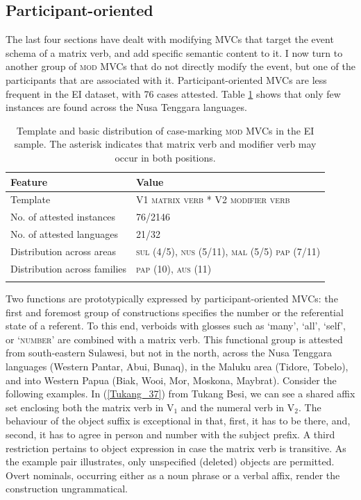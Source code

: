 \subsection{Participant-oriented}

The last four sections have dealt with modifying MVCs that target the event schema of a matrix verb, and add specific semantic content to it. I now turn to another group of \textsc{mod} MVCs that do not directly modify the event, but one of the participants that are associated with it. Participant-oriented MVCs are less frequent in the EI dataset, with 76 cases attested. Table \ref{table:participant} shows that only few instances are found across the Nusa Tenggara languages.

\begin{table}
\begin{tabular}{ll}
\lsptoprule
Feature&Value\tabularnewline
\midrule
Template&V1 \textsc{matrix verb} * V2 \textsc{modifier verb}\tabularnewline
No. of attested instances& 76/2146 \tabularnewline
No. of attested languages& 21/32 \tabularnewline
Distribution across areas& \textsc{sul} (4/5), \textsc{nus} (5/11), \textsc{mal} (5/5) \textsc{pap} (7/11) \tabularnewline
Distribution across families& \textsc{pap} (10), \textsc{aus} (11) \tabularnewline
\lspbottomrule
\end{tabular}
\caption[Template and basic distribution of case-marking \textsc{mod} MVCs]{Template and basic distribution of case-marking \textsc{mod} MVCs in the EI sample. The asterisk indicates that matrix verb and modifier verb may occur in both positions.}
\label{table:participant}
\end{table}

Two functions are prototypically expressed by participant-oriented MVCs: the first and foremost group of constructions specifies the number or the referential state of a referent. To this end, verboids with glosses such as `many', `all', `self', or `\textsc{number}' are combined with a matrix verb. This functional group is attested from south-eastern Sulawesi, but not in the north, across the Nusa Tenggara languages (Western Pantar, Abui, Bunaq), in the Maluku area (Tidore, Tobelo), and into Western Papua (Biak, Wooi, Mor, Moskona, Maybrat). Consider the following examples. In (\ref{Tukang_37}) from Tukang Besi, we can see a shared affix set enclosing both the matrix verb in V$_1$ and the numeral verb in V$_2$. The behaviour of the object suffix is exceptional in that, first, it has to be there, and, second, it has to agree in person and number with the subject prefix. A third restriction pertains to object expression in case the matrix verb is transitive. As the example pair illustrates, only unspecified (deleted) objects are permitted. Overt nominals, occurring either as a noun phrase or a verbal affix, render the construction ungrammatical.

